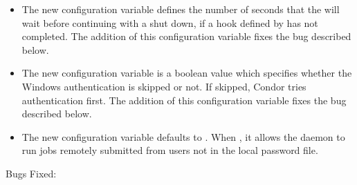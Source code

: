 \begin{itemize}

\item The new configuration variable 
defines the number of seconds that the  will wait
before continuing with a shut down,
if a hook defined by  has not completed.
The addition of this configuration variable fixes the bug described below.

\item The new configuration variable  
is a boolean value which specifies whether the Windows
 authentication is skipped or not.
If skipped, Condor tries  authentication first.
The addition of this configuration variable fixes the bug described below.

\item The new configuration variable  
defaults to .
When , 
it allows the  daemon to run jobs remotely submitted from 
users not in the local password file.

\end{itemize}
\noindent Bugs Fixed:

